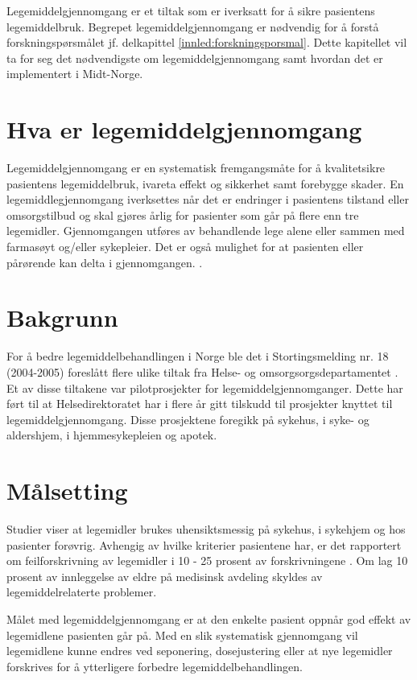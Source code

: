 Legemiddelgjennomgang er et tiltak som er iverksatt for å sikre pasientens legemiddelbruk. Begrepet legemiddelgjennomgang er nødvendig for å forstå forskningspørsmålet jf. delkapittel \ref{innled:forskningsporsmal}. Dette kapitellet vil ta for seg det nødvendigste om legemiddelgjennomgang samt hvordan det er implementert i Midt-Norge.

\section{Hva er legemiddelgjennomgang}
Legemiddelgjennomgang er en systematisk fremgangsmåte for å kvalitetsikre pasientens legemiddelbruk, ivareta effekt og sikkerhet samt forebygge skader. En legemiddlegjennomgang iverksettes når det er endringer i pasientens tilstand eller omsorgstilbud og skal gjøres årlig for pasienter som går på flere enn tre legemidler. Gjennomgangen utføres av behandlende lege alene eller sammen med farmasøyt og/eller sykepleier. Det er også mulighet for at pasienten eller pårørende kan delta i gjennomgangen. \citep{Helsedirektoratet_veileder_LMG}.

\section{Bakgrunn}
For å bedre legemiddelbehandlingen i Norge ble det i Stortingsmelding nr. 18 (2004-2005) foreslått flere ulike tiltak fra Helse- og omsorgsorgsdepartamentet \citep{Stortingsmelding_nr18}. Et av disse tiltakene var pilotprosjekter for legemiddelgjennomganger. Dette har ført til at Helsedirektoratet har i flere år gitt tilskudd til prosjekter knyttet til legemiddelgjennomgang. Disse prosjektene foregikk på sykehus, i syke- og aldershjem, i hjemmesykepleien og apotek.

\section{Målsetting}
Studier viser at legemidler brukes uhensiktsmessig på sykehus, i sykehjem og hos pasienter forøvrig. Avhengig av hvilke kriterier pasientene har, er det rapportert om feilforskrivning av legemidler i 10 - 25 prosent av forskrivningene \citep{NORGEP} \citep{Elderly_patients_in_general_practice} \citep{Inappropriate_Prescribing_for_Elderly_Americans}. Om lag 10 prosent av innleggelse av eldre på medisinsk avdeling skyldes av legemiddelrelaterte problemer. 

Målet med legemiddelgjennomgang er at den enkelte pasient oppnår god effekt av legemidlene pasienten går på. Med en slik systematisk gjennomgang vil legemidlene kunne endres ved seponering, dosejustering eller at nye legemidler forskrives for å ytterligere forbedre legemiddelbehandlingen.

